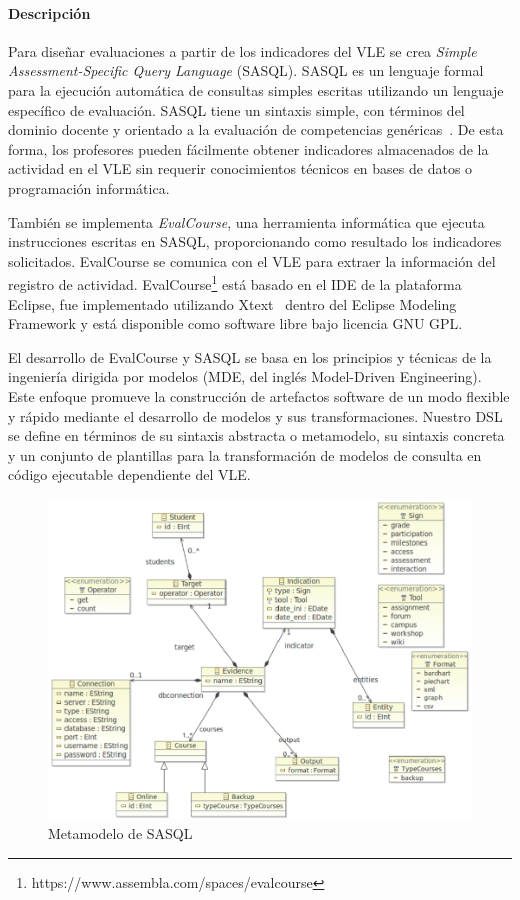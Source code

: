 			\paragraph{Descripción} %

			Para diseñar evaluaciones a partir de los indicadores del VLE se crea \emph{Simple Assessment-Specific Query Language} (SASQL). SASQL es un lenguaje formal para la ejecución automática de consultas simples escritas utilizando un lenguaje específico de evaluación. SASQL tiene un sintaxis simple, con términos del dominio docente y orientado a la evaluación de competencias genéricas~\cite{Balderas:2013}. De esta forma, los profesores pueden fácilmente obtener indicadores almacenados de la actividad en el VLE sin requerir conocimientos técnicos en bases de datos o programación informática.

			También se implementa \emph{EvalCourse}, una herramienta informática que ejecuta instrucciones escritas en SASQL, proporcionando como resultado los indicadores solicitados. EvalCourse se comunica con el VLE para extraer la información del registro de actividad. EvalCourse\footnote{https://www.assembla.com/spaces/evalcourse} está basado en el IDE de la plataforma Eclipse, fue implementado utilizando Xtext~\cite{eysholdt2010xtext} dentro del Eclipse Modeling Framework y está disponible como software libre bajo licencia GNU GPL.

			El desarrollo de EvalCourse y SASQL se basa en los principios y técnicas de la ingeniería dirigida por modelos (MDE, del inglés Model-Driven Engineering). Este enfoque promueve la construcción de artefactos software de un modo flexible y rápido mediante el desarrollo de modelos y sus transformaciones. Nuestro DSL se define en términos de su sintaxis abstracta o metamodelo, su sintaxis concreta y un conjunto de plantillas para la transformación de modelos de consulta en código ejecutable dependiente del VLE.

\begin{figure}
  \begin{center}
    \includegraphics[scale=0.4]{EvcMetamodel.png}
  \end{center}
  \caption{Metamodelo de SASQL}
  \label{fig:EvcMetamodel}
\end{figure}

